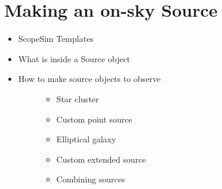 

\section{Making an on-sky Source%
  \label{making-an-on-sky-source}%
}

\begin{itemize}
\item ScopeSim Templates

\item What is inside a Source object

\item 
\begin{description}
\item[{How to make source objects to observe}] \leavevmode 
\begin{itemize}
\item Star cluster

\item Custom point source

\item Elliptical galaxy

\item Custom extended source

\item Combining sources
\end{itemize}

\end{description}
\end{itemize}
